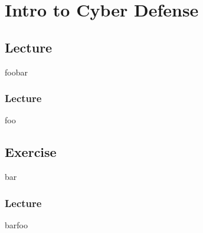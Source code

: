 \chapter{Intro to Cyber Defense}
\newpage

\section{Lecture}
foobar

\subsection{Lecture}
foo

\section{Exercise}
bar

\subsection{Lecture}
barfoo
